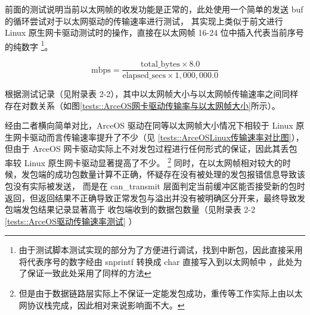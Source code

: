     前面的测试说明当前以太网帧的收发功能是正常的，此处使用一个简单的发送 buf 的循环尝试对于以太网驱动的传输速率进行测试，
    其实现上类似于前文进行 Linux 原生网卡驱动测试时的操作，直接在以太网帧 16-24 位中插入代表当前序号的纯数字
    \footnote{由于测试脚本测试实现的部分为了方便进行调试，找到中断包，因此直接采用将代表序号的数字经由 snprintf 转换成 char 直接写入到以太网帧中
    ，此处为了保证一致此处采用了同样的方法}。

    $$\text{mbps} = \frac{\text{total\_bytes} \times 8.0}{\text{elapsed\_secs} \times 1,000,000.0}$$

    根据测试记录（见附录表 2-2），其中以太网帧大小与以太网帧传输速率之间同样存在对数关系（如图\ref{tests::ArceOS网卡驱动传输率与以太网帧大小}所示）。

        \label{tests::ArceOS网卡驱动传输率与以太网帧大小}

    经由二者横向简单对比，ArceOS 驱动在同等以太网帧大小情况下相较于 Linux 原生网卡驱动而言传输速率提升了不少（见 \ref{tests::ArceOSLinux传输速率对比图}），
    但由于 ArceOS 网卡驱动实际上不对发包过程进行任何形式的保证，因此其丢包率较 Linux 原生网卡驱动显著提高了不少。
    \footnote{但是由于数据链路层实际上不保证一定能发包成功，重传等工作实际上由以太网协议栈完成，因此相对来说影响面不大。}
    同时，在以太网帧相对较大的时候，发包端的成功包数量计算不正确，怀疑存在没有被处理的发包报错信息导致该包没有实际被发送，
    而是在 can\_transmit 层面判定当前缓冲区能否接受新的包时返回，但返回结果不正确导致正常发包与溢出并没有被明确区分开来，最终导致发包端发包结果记录显著高于
    收包端收到的数据包数量（见附录表 2-2 \ref{tests::ArceOS驱动传输速率测试} ）
    
